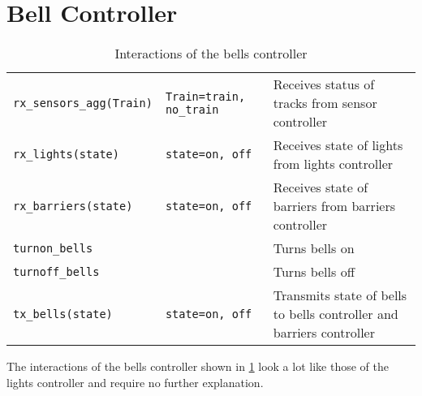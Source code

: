 \documentclass[final]{report}
\begin{document}
\section{Bell Controller}
\begin{table}[H]
\centering
    \begin{tabular}{|l|l|l|}
    \hline
    \texttt{rx\_sensors\_agg(Train)} & \texttt{Train=train, no\_train} & Receives status of tracks from sensor controller                     \\
    \texttt{rx\_lights(state)}       & \texttt{state=on, off}          & Receives state of lights from lights controller                      \\
    \texttt{rx\_barriers(state)}     & \texttt{state=on, off}          & Receives state of barriers from barriers controller                  \\ \hline
    \texttt{turnon\_bells}           &                                 & Turns bells on                                                       \\
    \texttt{turnoff\_bells}          &                                 & Turns bells off                                                      \\
    \texttt{tx\_bells(state)}        & \texttt{state=on, off}          & Transmits state of bells to bells controller and barriers controller \\ \hline
    \end{tabular}
\caption{Interactions of the bells controller}
\label{tab:bellsSignals}
\end{table}

The interactions of the bells controller shown in \cref{tab:bellsSignals} look a lot like those of the lights controller and require no further explanation.
\end{document}
